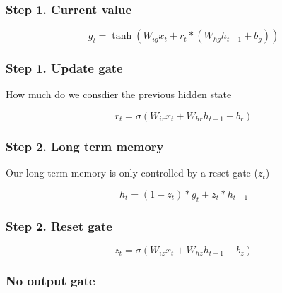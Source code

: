 \documentclass[11pt]{article}
\begin{document}
\subsubsection{Step 1. Current value}

\begin{equation*}
    g_t = \tanh(W_{ig}x_t + r_t \ast (W_{hg}h_{t-1} + b_g))
\end{equation*}

\subsubsection{Step 1. Update gate}

How much do we consdier the previous hidden state

\begin{equation*}
    r_t = \sigma(W_{ir}x_t + W_{hr}h_{t-1} + b_r)
\end{equation*}

\subsubsection{Step 2. Long term memory}

Our long term memory is only controlled by a reset gate ($z_t$)

\begin{equation*}
    h_t = (1-z_t) \ast g_t + z_t \ast h_{t-1}
\end{equation*}

\subsubsection{Step 2. Reset gate}

\begin{equation*}
    z_t = \sigma(W_{iz}x_t + W_{hz}h_{t-1} + b_z)
\end{equation*}

\subsubsection{No output gate}

\printbibliography
{}
\end{document}

